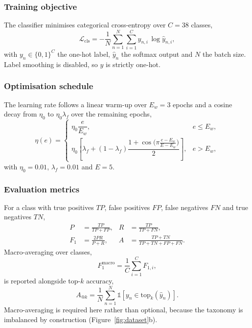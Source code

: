 \documentclass[journal]{IEEEtran}
\begin{document}
\subsubsection{Training objective}
The classifier minimises categorical cross-entropy over $C=38$ classes,
\begin{equation}
\mathcal{L}_{\mathrm{cls}} = -\frac{1}{N}\sum_{n=1}^{N}\sum_{i=1}^{C}
y_{n,i}\,\log \hat{y}_{n,i},
\label{eq:ce}
\end{equation}
with $y_n\in\{0,1\}^C$ the one-hot label, $\hat{y}_n$ the softmax output
and $N$ the batch size. Label smoothing is disabled, so $y$ is strictly
one-hot.

\subsubsection{Optimisation schedule}
The learning rate follows a linear warm-up over $E_w=3$ epochs and a cosine
decay \cite{loshchilov2017sgdr} from $\eta_0$ to $\eta_0\lambda_f$ over the
remaining epochs,
\begin{equation}
\eta(e)=
\begin{cases}
\eta_0\dfrac{e}{E_w}, & e \le E_w,\\[8pt]
\eta_0\!\left[\lambda_f+(1-\lambda_f)\dfrac{1+\cos\!\big(\pi\frac{e-E_w}{E-E_w}\big)}{2}\right],
& e > E_w,
\end{cases}
\label{eq:lr}
\end{equation}
with $\eta_0=0.01$, $\lambda_f=0.01$ and $E=5$.

\subsubsection{Evaluation metrics}
For a class with true positives $TP$, false positives $FP$, false negatives
$FN$ and true negatives $TN$,
\begin{align}
P &= \frac{TP}{TP+FP}, &
R &= \frac{TP}{TP+FN}, \label{eq:pr}\\
F_1 &= \frac{2PR}{P+R}, &
A &= \frac{TP+TN}{TP+TN+FP+FN}. \label{eq:f1}
\end{align}
Macro-averaging over classes,
\begin{equation}
F_1^{\mathrm{macro}} = \frac{1}{C}\sum_{i=1}^{C} F_{1,i},
\label{eq:macro}
\end{equation}
is reported alongside top-$k$ accuracy,
\begin{equation}
A_{@k} = \frac{1}{N}\sum_{n=1}^{N}
\mathbb{1}\!\left[y_n \in \mathrm{top}_k(\hat{y}_n)\right].
\label{eq:topk}
\end{equation}
Macro-averaging is required here rather than optional, because the
taxonomy is imbalanced by construction (Figure~\ref{fig:dataset}b).
\end{document}
